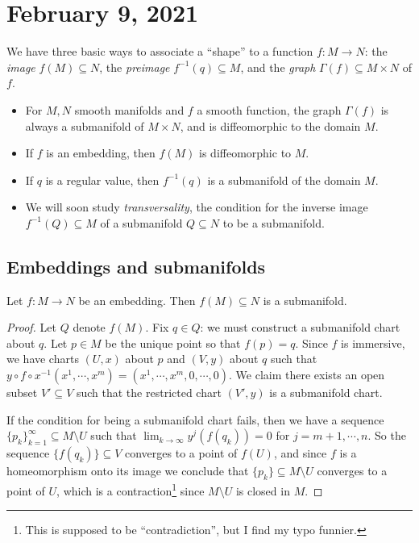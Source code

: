 \section{February 9, 2021}
We have three basic ways to associate a ``shape'' to a function $f \colon M \to N$: the \emph{image} $f(M)\subseteq N$, the \emph{preimage} $f^{-1}(q)\subseteq M$, and the \emph{graph} $\Gamma(f) \subseteq M\times N$ of $f$. 
\begin{itemize}
    \item For $M,N$ smooth manifolds and $f$ a smooth function, the graph $\Gamma (f)$ is always a submanifold of $M \times N$, and is diffeomorphic to the domain $M$.
    \item If $f$ is an embedding, then $f(M)$ is diffeomorphic to $M$.
    \item If $q$ is a regular value, then $f ^{-1}(q)$ is a submanifold of the domain $M$.
    \item We will soon study \emph{transversality}, the condition for the inverse image $f ^{-1}(Q) \subseteq M$ of a submanifold $Q \subseteq N$ to be a submanifold.
\end{itemize}

\subsection{Embeddings and submanifolds}
\begin{theorem}
    Let $f \colon M \to N$ be an embedding. Then $f(M)\subseteq N$ is a submanifold.
\end{theorem}
\begin{proof}
    Let $Q$ denote $f(M)$. Fix $q \in Q$: we must construct a submanifold chart about $q$. Let $p \in M$ be the unique point so that $f(p)=q$. Since $f$ is immersive, we have charts $(U,x)$ about $p$ and $(V,y)$ about $q$ such that $y \circ f\circ x^{-1}(x^1,\cdots ,x^m)=(x^1,\cdots ,x^m,0,\cdots ,0)$. We claim there exists an open subset $V' \subseteq V$ such that the restricted chart $(V',y)$ is a submanifold chart. 

    If the condition for being a submanifold chart fails, then we have a sequence $\{p_k\} _{k=1}^{\infty} \subseteq M \setminus  U$ such that $\lim _{k \to \infty}y^j (f(q_k))=0$ for $j=m+1,\cdots ,n$. So the sequence $\{f(q_k)\} \subseteq V$ converges to a point of $f(U)$, and since $f$ is a homeomorphism onto its image we conclude that $\{p_k\} \subseteq M \setminus U$ converges to a point of $U$, which is a contraction\footnote{This is supposed to be ``contradiction'', but I find my typo funnier.} since $M \setminus U$ is closed in $M$.
\end{proof}

